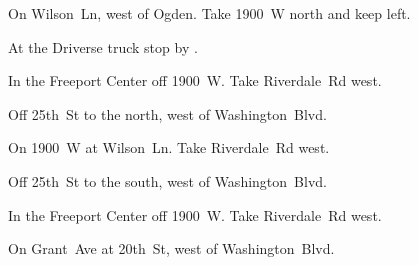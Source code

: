 
\begin{LocationList}

On Wilson~Ln, west of Ogden.
Take 1900~W north and keep left.

At the Driverse truck stop by   .

In the Freeport Center off 1900~W.
Take  Riverdale~Rd west.

Off 25th~St to the north, west of  Washington~Blvd.

On 1900~W at Wilson~Ln.
Take  Riverdale~Rd west.

Off 25th~St to the south, west of  Washington~Blvd.

In the Freeport Center off 1900~W.
Take  Riverdale~Rd west.

On Grant~Ave at 20th~St, west of  Washington~Blvd.

\end{LocationList}
